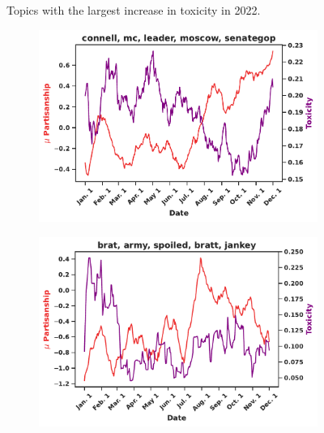\begin{figure}
\begin{subfigure}[l]{0.32\textwidth}
\caption{}
\label{fig:warship}
\end{subfigure}
\begin{minipage}[l]{1\textwidth}
\caption{Topics with the largest increase in toxicity in 2022. \label{fig:toxicity-swing}}
\end{minipage}
\vspace{-15pt}
\end{figure}



\begin{figure}
\begin{subfigure}[l]{0.32\textwidth}
\includegraphics[width=1\columnwidth]{figures/connell-conservative-final-20240425.pdf} 
\caption{}
\label{fig:moscow}
\end{subfigure}
\begin{subfigure}[l]{0.32\textwidth}
\includegraphics[width=1\columnwidth]{figures/brat-conservative-final-20240425.pdf} 

\end{subfigure}
\end{figure}
